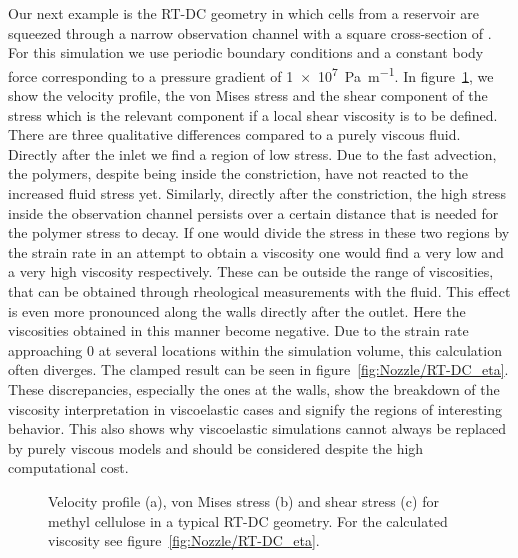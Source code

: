 \documentclass[a4paper,12pt]{scrartcl}
\begin{document}
Our next example is the RT-DC geometry in which cells from a reservoir are squeezed through a narrow observation channel \cite{Toepfner.2018, Fregin:2019gx} with a square cross-section of .
For this simulation we use periodic boundary conditions and a constant body force corresponding to a pressure gradient of \SI{1e7}{\pascal\per\meter}.
In figure~\ref{fig:RT-DC}, we show the velocity profile, the von Mises stress and the shear component of the stress which is the relevant component if a local shear viscosity is to be defined.
There are three qualitative differences compared to a purely viscous fluid.
Directly after the inlet we find a region of low stress.
Due to the fast advection, the polymers, despite being inside the constriction, have not reacted to the increased fluid stress yet.
Similarly, directly after the constriction, the high stress inside the observation channel persists over a certain distance that is needed for the polymer stress to decay. If one would divide the stress in these two regions by the strain rate in an attempt to obtain a viscosity one would find a very low and a very high viscosity respectively. These can be outside the range of viscosities, that can be obtained through rheological measurements with the fluid. This effect is even more pronounced along the walls directly after the outlet. Here the viscosities obtained in this manner become negative. Due to the strain rate approaching $0$ at several locations within the simulation volume, this calculation often diverges. The clamped result can be seen in figure~\ref{fig:Nozzle/RT-DC_eta}. These discrepancies, especially the ones at the walls, show the breakdown of the viscosity interpretation in viscoelastic cases and signify the regions of interesting behavior. This also shows why viscoelastic simulations cannot always be replaced by purely viscous models and should be considered despite the high computational cost.

 	\begin{figure}[H]
		\centering
		\caption{Velocity profile (a), von Mises stress (b) and shear stress (c) for methyl cellulose in a typical RT-DC geometry. For the calculated viscosity see figure~\ref{fig:Nozzle/RT-DC_eta}.}
		\label{fig:RT-DC}
	\end{figure}
\end{document}
